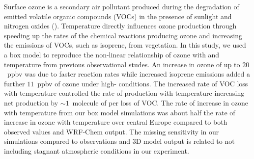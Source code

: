 Surface ozone is a secondary air pollutant produced during the degradation of emitted volatile organic compounds (VOCs) in the presence of sunlight and nitrogen oxides (). 
Temperature directly influences ozone production through speeding up the rates of the chemical reactions producing ozone and increasing the emissions of VOCs, such as isoprene, from vegetation.
In this study, we used a box model to reproduce the non-linear relationship of ozone with  and temperature from previous observational studes.
An increase in ozone of up to $20$~ppbv was due to faster reaction rates while increased isoprene emissions added a further $11$~ppbv of ozone under high- conditions.
The increased rate of VOC loss with temperature controlled the rate of  production with temperature increasing net  production by $\sim1$~molecule of  per loss of VOC.
The rate of increase in ozone with temperature from our box model simulations was about half the rate of increase in ozone with temperature over central Europe compared to both observed values and WRF-Chem output.
The missing sensitivity in our simulations compared to observations and 3D model output is related to not including stagnant atmospheric conditions in our experiment.
